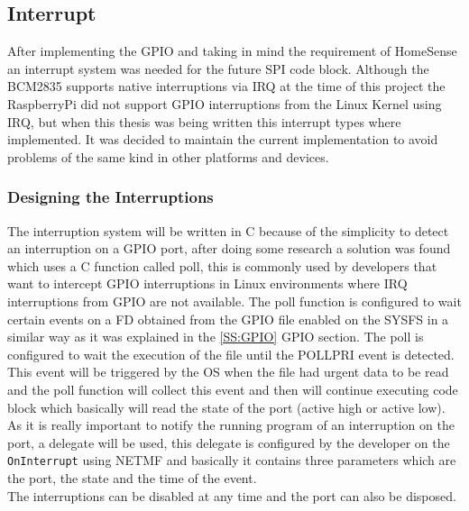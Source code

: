 \subsection{Interrupt}\label{SS:IOSharp-Interrupt}
After implementing the GPIO and taking in mind the requirement of HomeSense an interrupt system was needed for the future \gls{SPI}  code block. Although the \gls{BCM2835} supports native interruptions via \gls{IRQ} at the time of this project the RaspberryPi did not support GPIO interruptions from the Linux Kernel using \gls{IRQ}, but when this thesis was being written this interrupt types where implemented. It was decided to maintain the current implementation to avoid problems of the same kind in other platforms and devices.

\subsubsection{Designing the Interruptions}\label{SSS:IOSharp-Interrupt-Design}
The interruption system will be written in C because of the simplicity to detect an interruption on a GPIO port, after doing some research a solution was found which uses a C function called poll, this is commonly used by developers that want to intercept GPIO interruptions in Linux environments where IRQ interruptions from GPIO are not available. The poll function is configured to wait certain events on a \gls{FD} obtained from the GPIO file enabled on the SYSFS in a similar way as it was explained in the \ref{SS:GPIO} GPIO section. The poll is configured to wait the execution of the file until the POLLPRI event is detected. This event will be triggered by the OS when the file had urgent data to be read and the poll function will collect this event and then will continue executing code block which basically will read the state of the port (active high or active low). As it is really important to notify the running program of an interruption on the port, a delegate will be used, this delegate is configured by the developer on the \verb!OnInterrupt! using NETMF and basically it contains three parameters which are the port, the state and the time of the event.
\\
The interruptions can be disabled at any time and the port can also be disposed.

